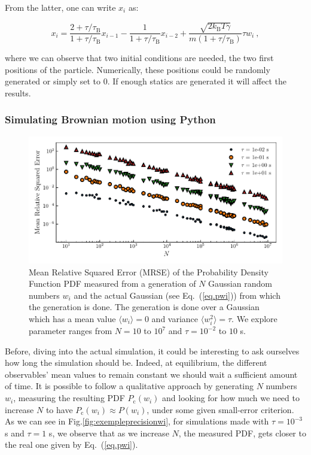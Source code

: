 From the latter, one can write $x_i$ as:

\begin{equation}	
	x_i = \frac{2 + \tau /\tau_\mathrm{B}}{1 + \tau / \tau_\mathrm{B} } x_{i-1} 
	- \frac{1}{1 + \tau / \tau_\mathrm{B}}x_{i-2}
	+ \frac{\sqrt{2k_\mathrm{B}T\gamma}}{m(1 + \tau/\tau_\mathrm{B})} \tau w_i ~,
	\label{Eq.numfulllangevin}
\end{equation}

where we can observe that two initial conditions are needed, the two first positions of the particle. Numerically, these positions could be randomly generated or simply set to $0$. If enough statics are generated it will affect the results.

\subsubsection{Simulating Brownian motion using Python}

\begin{figure}[h]
	\centering
	\includegraphics{02_body/chapter1/image/noise_simulation/MSE.pdf}
	\caption{Mean Relative Squared Error (\gls{MRSE}) of the Probability Density Function \gls{PDF} measured from a generation of $N$ Gaussian random numbers $w_i$ and the actual Gaussian (see Eq.~(\ref{eq.pwi})) from which the generation is done. The generation is done over a Gaussian which has a mean value $\langle w_i \rangle =0$ and variance $\langle w_i^2 \rangle = \tau$. We explore parameter ranges from $N = 10$ to $10^7$ and $\tau = 10^{-2}$ to $10$ s.}  
	\label{fig:MSEwi}
\end{figure}

Before, diving into the actual simulation, it could be interesting to ask ourselves how long the simulation should be. Indeed, at equilibrium, the different observables' mean values to remain constant we should wait a sufficient amount of time. It is possible to follow a qualitative approach by generating $N$ numbers $w_i$, measuring the resulting \gls{PDF} $P_\mathrm{c}(w_i)$ and looking for how much we need to increase $N$ to have $P_\mathrm{c}(w_i) \approx P(w_i)$, under some given small-error criterion. As we can see in Fig.\ref{fig:exempleprecisionwi}, for simulations made with $\tau = 10^{-3}$ s and $\tau = 1$ s, we observe that as we increase $N$, the measured PDF, gets closer to the real one given by Eq.~(\ref{eq.pwi}). 




